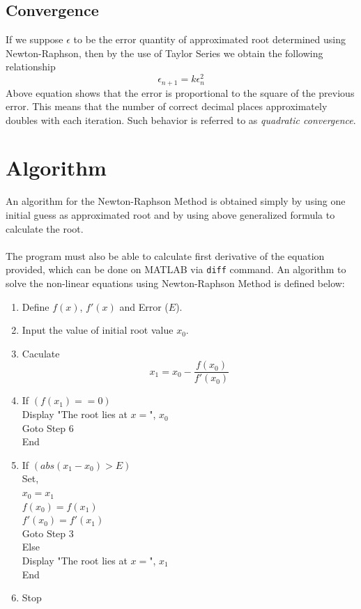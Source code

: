 \documentclass[12pt, a4paper, titlepage]{article}
\begin{document}
\subsection{Convergence}
If we suppose $\epsilon$ to be the error quantity of approximated root determined using Newton-Raphson, then by the use of Taylor Series we obtain the following relationship
\[
\epsilon_{n+1} = k \epsilon_n^2
\]
Above equation shows that the error is proportional to the square of the previous error. This means that the number of correct decimal places approximately doubles with each iteration. Such behavior is referred to as \textit{quadratic convergence}.

\section{Algorithm}
An algorithm for the Newton-Raphson Method is obtained simply by using one initial guess as approximated root and by using above generalized formula to calculate the root. \\ \\
The program must also be able to calculate first derivative of the equation provided, which can be done on MATLAB via \verb|diff| command.   An algorithm to solve the non-linear equations using Newton-Raphson Method is defined below:\\
\begin{enumerate}
\item Define $f(x)$, $f'(x)$ and Error ($E$).
\item Input the value of initial root value $x_0$.
\item Caculate
\[
x_1 = x_0 - \frac{f(x_0)}{f'(x_0)}
\]
\item If $(f(x_1) ==  0)$\\
\phantom{x}\hspace{3ex} Display "The root lies at $x =$", $x_0$\\
\phantom{x}\hspace{3ex} Goto Step 6\\
End\\
\item If $(abs(x_1 - x_0) > E)$\\
\phantom{x}\hspace{3ex} Set,\\
\phantom{x}\hspace{6ex} $x_0 = x_1$\\
\phantom{x}\hspace{6ex} $f(x_0) = f(x_1)$\\
\phantom{x}\hspace{6ex} $f'(x_0) = f'(x_1)$\\
\phantom{x}\hspace{3ex} Goto Step 3\\
Else\\	
\phantom{x}\hspace{3ex} Display "The root lies at $x =$", $x_1$\\
End\\
\item Stop
\end{enumerate}
\end{document}
